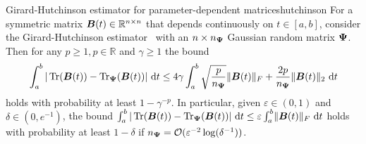 
\begin{theorem}{Girard-Hutchinson estimator for parameter-dependent matrices}{hutchinson}
    For a symmetric matrix $\boldsymbol{B}(t) \in \mathbb{R}^{n \times n}$ that depends continuously on $t \in [a, b]$, consider the  Girard-Hutchinson estimator~ with an $n\times n_{\boldsymbol{\Psi}}$ Gaussian random matrix $\boldsymbol{\Psi}$. Then for any $p \geq 1, p \in \mathbb{R}$ and $\gamma \geq 1$ the bound 
    \begin{equation} \label{eq:ghbound}
        \int_{a}^{b} |\operatorname{Tr}(\boldsymbol{B}(t)) - \operatorname{Tr}_{\boldsymbol{\Psi}}(\boldsymbol{B}(t))|~\mathrm{d}t \leq 4 \gamma \int_{a}^{b} \sqrt{\frac{p}{n_{\boldsymbol{\Psi}}}}  \lVert \boldsymbol{B}(t) \rVert _F + \frac{2 p}{n_{\boldsymbol{\Psi}}} \lVert \boldsymbol{B}(t) \rVert _2 ~\mathrm{d}t
    \end{equation}
    holds with probability at least $1 - \gamma^{-p}$.
    In particular, given $\varepsilon \in (0, 1)$ and $\delta \in (0, e^{-1})$, the bound $\int_{a}^{b} | \operatorname{Tr}(\boldsymbol{B}(t)) - \operatorname{Tr}_{\boldsymbol{\Psi}}(\boldsymbol{B}(t)) | ~\mathrm{d}t \leq \varepsilon \int_{a}^{b} \lVert \boldsymbol{B}(t) \rVert _F~\mathrm{d}t$ holds 
    with probability at least $1-\delta$ if $n_{\boldsymbol{\Psi}} = \mathcal{O}(\varepsilon^{-2} \log(\delta^{-1}))$.
\end{theorem}

